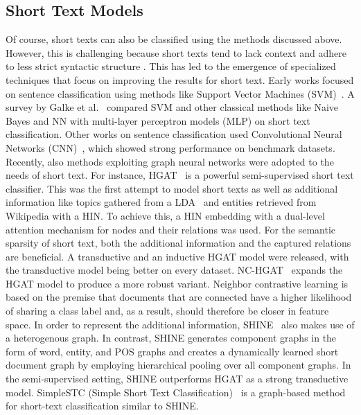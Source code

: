 \documentclass[runningheads]{llncs}
\begin{document}
\subsection{Short Text Models}
\label{rw-short}
Of course, short texts can also be classified using the methods discussed above. 
However, this is challenging because short texts tend to lack context and adhere to less strict syntactic structure \cite{shine}.
This has led to the emergence of specialized techniques that focus on improving the results for short text.
Early works focused on sentence classification using methods like Support Vector Machines (SVM)~\cite{DBLP:journals/air/SilvaCMW11}.
A survey by Galke et al.~\cite{DBLP:conf/kcap/GalkeMSBS17} compared SVM and other classical methods like Naive Bayes and NN with multi-layer perceptron models (MLP) on short text classification.
Other works on sentence classification used Convolutional Neural Networks (CNN)~\cite{wang2021short,DBLP:conf/naacl/ZhangRW16,DBLP:conf/acl/KalchbrennerGB14}, which showed strong performance on benchmark datasets.
Recently, also methods exploiting graph neural networks were adopted to the needs of short text.
For instance, \ac{HGAT}~\cite{hgat} is a powerful semi-supervised short text classifier.
This was the first attempt to model short texts as well as additional information like topics gathered from a \ac{LDA}~\cite{2003LDA} and entities retrieved from Wikipedia with a \ac{HIN}.
To achieve this, a HIN embedding with a dual-level attention mechanism for nodes and their relations was used. For the semantic sparsity of short text, both the additional information and the captured relations are beneficial.
A transductive and an inductive HGAT model were released, with the transductive model being better on every dataset.
NC-HGAT~\cite{nc-hgat} expands the HGAT model to produce a more robust variant.
Neighbor contrastive learning is based on the premise that documents that are connected have a higher likelihood of sharing a class label and, as a result, should therefore be closer in feature space.
In order to represent the additional information, SHINE~\cite{shine} also makes use of a heterogenous graph. In contrast, SHINE generates component graphs in the form of word, entity, and \ac{POS} graphs and creates a dynamically learned short document graph by employing hierarchical pooling over all component graphs. In the semi-supervised setting, SHINE outperforms HGAT as a strong transductive model.
SimpleSTC (Simple Short Text Classification)~\cite{DBLP:conf/emnlp/ZhengWYD22} is a graph-based method for short-text classification similar to SHINE. 
\end{document}
